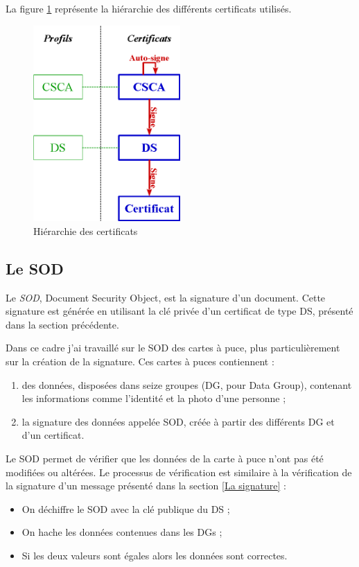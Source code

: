 La figure \ref{hierarchie_CSCA_DS} représente la hiérarchie des différents certificats utilisés.
\begin{figure}[!h]
	\center
	\includegraphics[width=0.5\textwidth]{img/hierarchie_CSCA_DS.png}
	\caption{Hiérarchie des certificats}
	\label{hierarchie_CSCA_DS}
\end{figure}


\subsection{Le SOD}

Le \textit{SOD}, Document Security Object, est la signature d'un document.
Cette signature est générée en utilisant la clé privée d'un certificat de type DS, présenté dans la section précédente.

Dans ce cadre j'ai travaillé sur le SOD des cartes à puce, plus particulièrement sur la création de la signature.
Ces cartes à puces contiennent :
\begin{enumerate}
	\item des données, disposées dans seize groupes (DG, pour Data Group), contenant les informations comme l'identité et la photo d'une personne ;
	\item la signature des données appelée SOD, créée à partir des différents DG et d'un certificat.
\end{enumerate}

Le SOD permet de vérifier que les données de la carte à puce n'ont pas été modifiées ou altérées.
Le processus de vérification est similaire à la vérification de la signature d'un message présenté dans la section \ref{La signature} :
\begin{itemize}
	\item On déchiffre le SOD avec la clé publique du DS ;
	\item On hache les données contenues dans les DGs ;
	\item Si les deux valeurs sont égales alors les données sont correctes.
\end{itemize}

